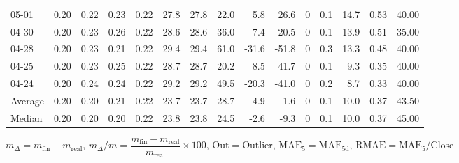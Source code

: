 \begin{threeparttable}
{\begin{tabular}{lrrrrrrrrrrrrrr}
  05-01 &          0.20 &          0.22 &          0.23 &        0.22 &                27.8 &               27.8 &                22.0 &        5.8 &         26.6 &              0 &                 0.1 &             14.7 &            0.53 &                  40.00 \\
  04-30 &          0.20 &          0.23 &          0.26 &        0.22 &                28.6 &               28.6 &                36.0 &       -7.4 &        -20.5 &              0 &                 0.1 &             13.9 &            0.51 &                  35.00 \\
  04-28 &          0.20 &          0.23 &          0.21 &        0.22 &                29.4 &               29.4 &                61.0 &      -31.6 &        -51.8 &              0 &                 0.3 &             13.3 &            0.48 &                  40.00 \\
  04-25 &          0.20 &          0.23 &          0.25 &        0.22 &                28.7 &               28.7 &                20.2 &        8.5 &         41.7 &              0 &                 0.1 &              9.3 &            0.35 &                  40.00 \\
  04-24 &          0.20 &          0.24 &          0.24 &        0.22 &                29.2 &               29.2 &                49.5 &      -20.3 &        -41.0 &              0 &                 0.2 &              8.7 &            0.33 &                  40.00 \\
Average &          0.20 &          0.20 &          0.21 &        0.22 &                23.7 &               23.7 &                28.7 &       -4.9 &         -1.6 &              0 &                 0.1 &             10.0 &            0.37 &                  43.50 \\
 Median &          0.20 &          0.20 &          0.20 &        0.22 &                23.8 &               23.8 &                24.5 &       -2.6 &         -9.3 &              0 &                 0.1 &             10.0 &            0.37 &                  45.00 \\
\bottomrule
\end{tabular}
}
\begin{tablenotes}\footnotesize
\item $m_\Delta=m_{\text{fin}}-m_{\text{real}}$,
$m_\Delta/m=\dfrac{m_{\text{fin}}-m_{\text{real}}}{m_{\text{real}}}\times100$,
$\mathrm{Out}=\text{Outlier}$,
$\mathrm{MAE}_5=\mathrm{MAE}_{5\text{d}}$,
$\mathrm{RMAE}=\mathrm{MAE}_5/\text{Close}$
\end{tablenotes}
\end{threeparttable}
\endgroup

